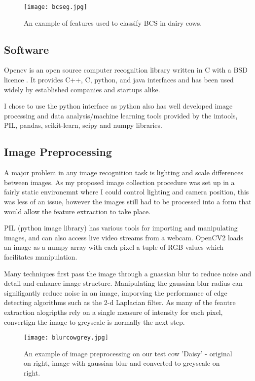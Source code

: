 \documentclass[11pt]{article}
\begin{document}
	\begin{figure}[h!]
		\centering
		\texttt{[image: bcseg.jpg]}
		\caption{An example of features used to classify BCS in dairy cows. \cite{Elanco}}
		\label{fig:<+label+>}
	\end{figure}


\subsection{Software}
	Opencv is an open source computer recognition library written in C with a BSD licence \cite{opencv_library}.
	It provides C++, C, python, and java interfaces and has been used widely by established companies and startups alike.


	I chose to use the python interface as python also has well developed image processing and data analysis/machine learning tools provided by the imtools, PIL, pandas, scikit-learn, scipy and numpy libraries.

\subsection{Image Preprocessing}
	A major problem in any image recognition task is lighting and scale differences between images.
	As my proposed image collection procedure was set up in a fairly static environemnt where I could control lighting and camera position, this was less of an issue, however the images still had to be processed into a form that would allow the feature extraction to take place.


	PIL (python image library) has various tools for importing and manipulating images, and can also access live video streams from a webcam.
	OpenCV2 loads an image as a numpy array with each pixel a tuple of RGB values which facilitates manipulation.


	Many techniques first pass the image through a guassian blur to reduce noise and detail and enhance image structure. 
	Manipulating the gaussian blur radius can signifigantly reduce noise in an image, imporving the performance of edge detecting algorithms such as the 2-d Laplacian filter.
	As many of the feautre extraction alogripths rely on a single measure of intensity for each pixel, convertign the image to greyscale is normally the next step.

	\begin{figure}[h!]
		\centering
		\texttt{[image: blurcowgrey.jpg]}
		\caption{An example of image preprocessing on our test cow 'Daisy' - original on right, image with gaussian blur and converted to greyscale on right.}
		\label{fig:<+label+>}
	\end{figure}
\end{document}
